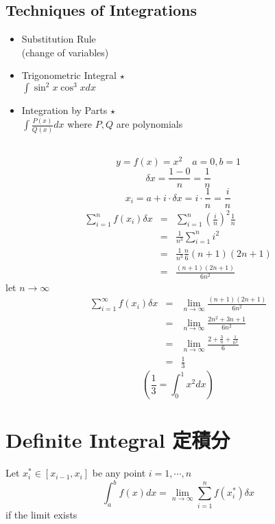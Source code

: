 \subsection*{Techniques of Integrations}
\begin{itemize}
\item Substitution Rule\\
(change of variables)
\item Trigonometric Integral $\star$\\
$\displaystyle \int \sin^2 x \cos ^3 x dx$
\item Integration by Parts $\star$\\
$\displaystyle \int \frac{P(x)}{Q(x)} dx$ where $P, Q$ are polynomials\\\\
\end{itemize}
\begin{eg}
$$y= f(x)= x^2 \quad a=0, b=1$$
$$\displaystyle \delta x = \frac{1-0}{n} = \frac{1}{n}$$
$$\displaystyle x_i = a+ i \cdot \delta x = i \cdot \frac{1}{n} = \frac{i}{n}$$
$$\begin{array}{rcl}
\displaystyle \sum\limits_{i=1}^n f(x_i)\delta x & = & \displaystyle \sum\limits_{i=1}^n (\frac{i}{n})^2 \frac{1}{n}\\
& = & \displaystyle \frac{1}{n^3} \sum\limits_{i=1}^n i^2\\
& = & \displaystyle \frac{1}{n^3} \frac{n}{6} (n+1)(2n+1)\\
& = & \displaystyle \frac{(n+1)(2n+1)}{6n^2}
\end{array}$$
let $n \to \infty$
$$\begin{array}{rcl}
\displaystyle \sum\limits_{i=1}^\infty f(x_i)\delta x & = & \displaystyle \lim_{n\to \infty} \frac{(n+1)(2n+1)}{6n^2}\\
& = & \displaystyle \lim_{n\to \infty} \frac{2n^2+3n+1}{6n^2}\\
& = & \displaystyle \lim_{n\to \infty} \frac{2+\frac{3}{n} + \frac{1}{n^2}}{6}\\
& = & \displaystyle \frac{1}{3}
\end{array}$$
$$(\displaystyle \frac{1}{3} = \int_0^1 x^2 dx)$$
\end{eg}
\section{Definite Integral 定積分}
\begin{defn}
Let $x_i^* \in [x_{i-1}, x_i]$ be any point \quad $i=1, \cdots, n$\\
$$\displaystyle \int_a^b f(x)dx= \lim_{n\to \infty} \sum\limits_{i=1}^n f(x_i^*) \delta x$$ if the limit exists
\end{defn}
